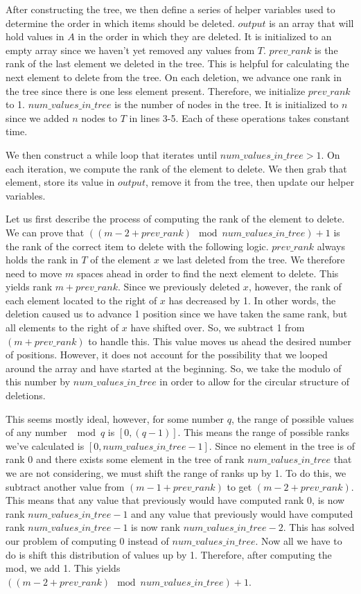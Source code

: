 \documentclass[11pt]{article}
\begin{document}
After constructing the tree, we then define a series of helper variables used to determine the order in which items should be deleted. $output$ is an array that will hold values in $A$ in the order in which they are deleted. It is initialized to an empty array since we haven't yet removed any values from $T$. $prev\_rank$ is the rank of the last element we deleted in the tree. This is helpful for calculating the next element to delete from the tree. On each deletion, we advance one rank in the tree since there is one less element present. Therefore, we initialize $prev\_rank$ to 1. $num\_values\_in\_tree$ is the number of nodes in the tree. It is initialized to $n$ since we added $n$ nodes to $T$ in lines 3-5. Each of these operations takes constant time.

We then construct a while loop that iterates until $num\_values\_in\_tree > 1$. On each iteration, we compute the rank of the element to delete. We then grab that element, store its value in $output$, remove it from the tree, then update our helper variables.

Let us first describe the process of computing the rank of the element to delete. We can prove that $((m - 2 + prev\_rank) \mod num\_values\_in\_tree) + 1$ is the rank of the correct item to delete with the following logic. $prev\_rank$ always holds the rank in $T$ of the element $x$ we last deleted from the tree. We therefore need to move $m$ spaces ahead in order to find the next element to delete. This yields rank $m + prev\_rank$. Since we previously deleted $x$, however, the rank of each element located to the right of $x$ has decreased by 1. In other words, the deletion caused us to advance 1 position since we have taken the same rank, but all elements to the right of $x$ have shifted over. So, we subtract 1 from $(m + prev\_rank)$ to handle this. This value moves us ahead the desired number of positions. However, it does not account for the possibility that we looped around the array and have started at the beginning. So, we take the modulo of this number by $num\_values\_in\_tree$ in order to allow for the circular structure of deletions.

This seems mostly ideal, however, for some number $q$, the range of possible values of any number $\mod q$ is $[0,(q-1)]$. This means the range of possible ranks we've calculated is $[0, num\_values\_in\_tree - 1]$. Since no element in the tree is of rank 0 and there exists some element in the tree of rank $num\_values\_in\_tree$ that we are not considering, we must shift the range of ranks up by 1. To do this, we subtract another value from $(m - 1 + prev\_rank)$ to get $(m - 2 + prev\_rank)$. This means that any value that previously would have computed rank 0, is now rank $num\_values\_in\_tree - 1$ and any value that previously would have computed rank $num\_values\_in\_tree - 1$ is now rank $num\_values\_in\_tree - 2$. This has solved our problem of computing 0 instead of $num\_values\_in\_tree$. Now all we have to do is shift this distribution of values up by 1. Therefore, after computing the mod, we add 1. This yields $((m - 2 + prev\_rank) \mod num\_values\_in\_tree) + 1$.
\end{document}
